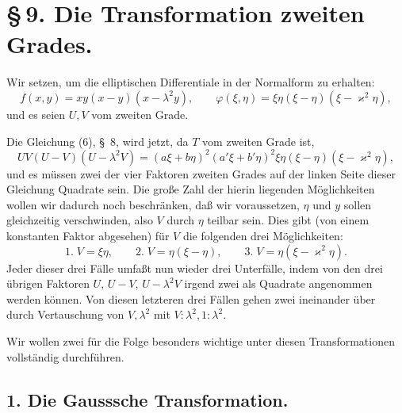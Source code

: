 \documentclass[11pt]{article}
\begin{document}
\section*{\S\,9. Die Transformation zweiten Grades.}

Wir setzen, um die elliptischen Differentiale in der Normalform zu erhalten:
\[
f(x,y)=xy(x-y)(x-\lambda^2y),\qquad
\varphi(\xi,\eta)=\xi\eta(\xi-\eta)(\xi-\varkappa^2\eta),
\]
und es seien $U,V$ vom zweiten Grade.

Die Gleichung (6), \S~8, wird jetzt, da $T$ vom zweiten Grade ist,
\begin{equation}
UV(U-V)(U-\lambda^2V)
=(a\xi+b\eta)^2(a'\xi+b'\eta)^2\xi\eta(\xi-\eta)(\xi-\varkappa^2\eta),
\tag{1}
\end{equation}
und es müssen zwei der vier Faktoren zweiten Grades auf der linken Seite dieser Gleichung Quadrate sein. Die große Zahl der hierin liegenden Möglichkeiten wollen wir dadurch noch beschränken, daß wir voraussetzen, $\eta$ und $y$ sollen gleichzeitig verschwinden, also $V$ durch $\eta$ teilbar sein. Dies gibt (von einem konstanten Faktor abgesehen) für $V$ die folgenden drei Möglichkeiten:
\[
1.\; V=\xi\eta,\qquad
2.\; V=\eta(\xi-\eta),\qquad
3.\; V=\eta(\xi-\varkappa^2\eta).
\]
Jeder dieser drei Fälle umfaßt nun wieder drei Unterfälle, indem von den drei übrigen Faktoren $U$, $U-V$, $U-\lambda^2V$ irgend zwei als Quadrate angenommen werden können. Von diesen letzteren drei Fällen gehen zwei ineinander über durch Vertauschung von $V,\lambda^2$ mit $V:\lambda^2,1:\lambda^2$.

Wir wollen zwei für die Folge besonders wichtige unter diesen Transformationen vollständig durchführen.

\subsection*{1. Die Gausssche Transformation.}
\end{document}
